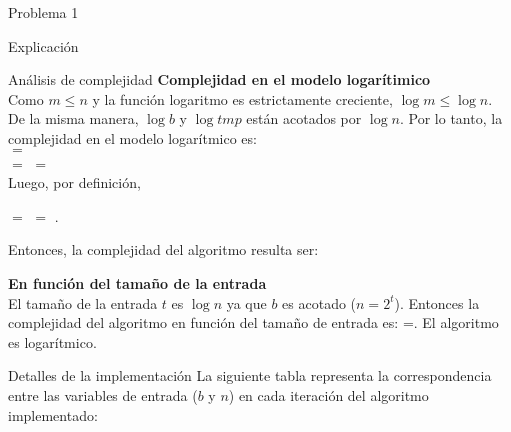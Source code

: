 \begin{section}{Problema 1}
\begin{subsection}{Explicación}
\begin{subsubsection}{Análisis de complejidad}
		\vspace{0.5cm}
		\noindent\textbf{Complejidad en el modelo logarítimico}\\

Como $m\leq n$ y la función logaritmo es estrictamente creciente, $\log m \leq \log n$. De la misma manera, $\log b$ y $\log tmp$ están acotados por $\log n$. Por lo tanto, la complejidad en el modelo logarítmico es: \\
 $=$ \\
$=$  $=$  \\

Luego, por definición, 
			\begin{center}
				 $=$  $=$ .
			\end{center}




		Entonces, la complejidad del algoritmo resulta ser: \VSP
		
		\noindent\textbf{En función del tamaño de la entrada}\\

			El tamaño de la entrada $t$ es $\log n$ ya que $b$ es acotado ($n=2^t$). Entonces la complejidad del algoritmo en función del tamaño de entrada es: =. El algoritmo es logarítmico.

		\end{subsubsection}
	\end{subsection}

	\begin{subsection}{Detalles de la implementación}
		La siguiente tabla representa la correspondencia entre las variables de entrada ($b$ y $n$) en cada iteración del algoritmo implementado:


\end{subsection}
\end{section}
